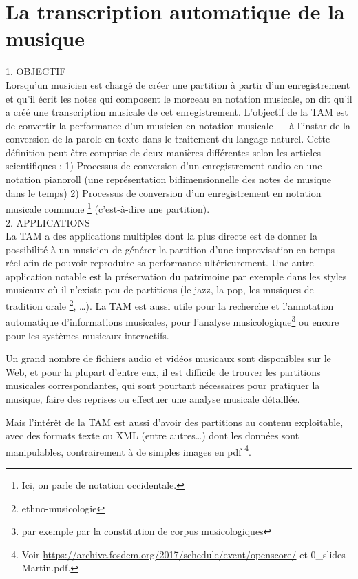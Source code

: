 \section{La transcription automatique de la musique}
1. OBJECTIF\\
Lorsqu’un musicien est chargé de créer une partition à partir d’un
enregistrement et qu’il écrit les notes qui composent le morceau en notation
musicale, on dit qu’il a créé une transcription musicale de cet enregistrement.
L’objectif de la TAM \cite{future_directions} est de convertir la performance
d’un musicien en notation musicale — à l’instar de la conversion de la parole
en texte dans le traitement du langage naturel. Cette définition peut être
comprise de deux manières différentes selon les articles scientifiques :
1) Processus de conversion d’un enregistrement audio en une notation pianoroll
(une représentation bidimensionnelle des notes de musique dans le temps)
2) Processus de conversion d’un enregistrement en notation musicale commune
\footnote{Ici, on parle de notation occidentale.} (c’est-à-dire une
partition).\\

2. APPLICATIONS\\
La TAM a des applications multiples \cite{future_directions} dont la plus
directe est de donner la possibilité à un musicien de générer la partition
d’une improvisation en temps réel afin de pouvoir reproduire sa performance
ultérieurement. Une autre application notable est la préservation du patrimoine
par exemple dans les styles musicaux où il n’existe peu de partitions (le
jazz, la pop, les musiques de tradition orale \footnote{ethno-musicologie}, …).
La TAM est aussi utile pour la recherche et l’annotation automatique
d’informations musicales, pour l’analyse musicologique\footnote{par exemple
par la constitution de corpus musicologiques} ou encore pour les systèmes
musicaux interactifs.

Un grand nombre de fichiers audio et vidéos musicaux sont disponibles sur le
Web, et pour la plupart d’entre eux, il est difficile de trouver les partitions
musicales correspondantes, qui sont pourtant nécessaires pour pratiquer la
musique, faire des reprises ou effectuer une analyse musicale détaillée.


Mais l’intérêt de la TAM est aussi d’avoir des partitions au contenu
exploitable, avec des formats texte ou XML (entre autres…) dont les données
sont manipulables, contrairement à de simples images en pdf
\footnote{Voir \url{https://archive.fosdem.org/2017/schedule/event/openscore/}
    et 0\_slides-Martin.pdf.}.\\

